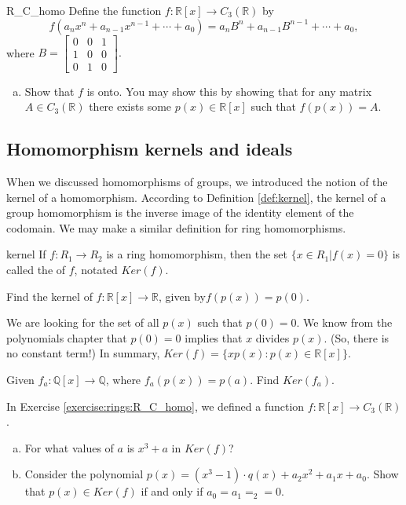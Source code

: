 \begin{exercise}{R_C_homo}
Define the function $f:{\mathbb R}[x]\rightarrow C_3({\mathbb R})$ by
\[f(a_nx^n+a_{n-1}x^{n-1}+\cdots +a_0)=a_nB^n+a_{n-1}B^{n-1}+\cdots +a_0,\] 
where $B=
\begin{bmatrix}
0 & 0 & 1\\
1 & 0 & 0\\
0 & 1 & 0
\end{bmatrix}.$

\begin{enumerate}[(a)]
\item Show that $f$ is onto.  You may show this by showing that for any matrix $A\in C_3({\mathbb R})$ there exists some $p(x)\in {\mathbb R}[x]$ such that $f(p(x))=A$.
\end{enumerate}
\end{exercise}



\subsection{Homomorphism kernels and ideals}

When we discussed homomorphisms of groups, we introduced the notion of the kernel of a homomorphism.  According to Definition \ref{def:kernel}, the kernel of a group homomorphism is the inverse image of the identity element of the codomain.  We may make a similar definition for ring homomorphisms.  

\begin{defn}{kernel}
If $f:R_1\rightarrow R_2$ is a ring homomorphism, then the set $\{x\in R_1|f(x)=0\}$ is called the  of $f$, notated $Ker(f)$.
\end{defn}

\begin{example}{}
Find the kernel of $f:{\mathbb R}[x]\rightarrow{\mathbb R}$, given by$f(p(x))=p(0)$.

We are looking for the set of all $p(x)$ such that $p(0)=0$. 
We know from the polynomials chapter that $p(0)=0$ implies that $x$ divides $p(x)$.  (So, there is no constant term!)  In summary, $Ker(f)=\{xp(x): p(x)\in{\mathbb R}[x]\}$.
\end{example}

\begin{exercise}{}
Given $f_a:{\mathbb Q}[x]\rightarrow{\mathbb Q}$, where $f_a(p(x))=p(a)$.  Find $Ker(f_a)$.
\end{exercise}

\begin{exercise}{}
In Exercise \ref{exercise:rings:R_C_homo}, we defined a function $f:{\mathbb R}[x]\rightarrow C_3({\mathbb R})$.
\begin{enumerate}[(a)]
\item For what values of $a$ is $x^3+a$ in $Ker(f)$?
\item Consider the polynomial $p(x)=(x^3-1)\cdot q(x)+a_2x^2+a_1x+a_0$.  Show that $p(x)\in Ker(f)$ if and only if $a_0=a_1=_2=0$.
\end{enumerate}
\end{exercise}

